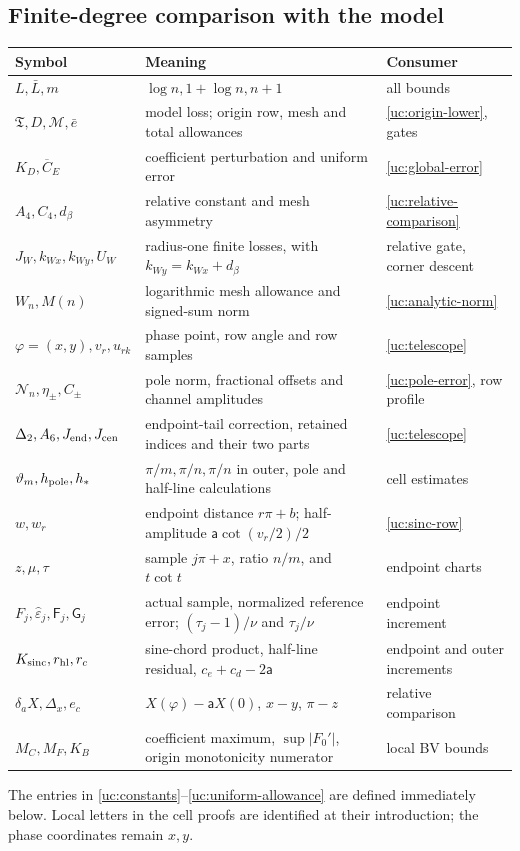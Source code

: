 \subsection{Finite-degree comparison with the model}
\label{uc:finite-comparison}

\begin{center}\small
\begin{tabular}{@{}p{.22\linewidth}p{.47\linewidth}p{.23\linewidth}@{}}
\toprule
Symbol & Meaning & Consumer\\\midrule
$L,\bar L,m$ & $\log n,1+\log n,n+1$ & all bounds\\
$\mathfrak T,D,\mathcal M,\bar e$ & model loss; origin row, mesh and total allowances & \eqref{uc:origin-lower}, gates\\
$K_D,\overline C_E$ & coefficient perturbation and uniform error & \eqref{uc:global-error}\\
$A_4,C_4,d_\beta$ & relative constant and mesh asymmetry & \eqref{uc:relative-comparison}\\
$J_W,k_{Wx},k_{Wy},U_W$ & radius-one finite losses, with $k_{Wy}=k_{Wx}+d_\beta$ & relative gate, corner descent\\
$W_n,M(n)$ & logarithmic mesh allowance and signed-sum norm & \eqref{uc:analytic-norm}\\
$\varphi=(x,y),v_r,u_{rk}$ & phase point, row angle and row samples & \eqref{uc:telescope}\\
$\mathcal N_n,\eta_\pm,C_\pm$ & pole norm, fractional offsets and channel amplitudes & \eqref{uc:pole-error}, row profile\\
$\Delta_2,A_6,J_{\rm end},J_{\rm cen}$ & endpoint-tail correction, retained indices and their two parts & \eqref{uc:telescope}\\
$\vartheta_m,h_{\rm pole},h_*$ & $\pi/m,\pi/n,\pi/n$ in outer, pole and half-line calculations & cell estimates\\
$w,w_r$ & endpoint distance $r\pi+b$; half-amplitude $\mathsf a\cot(v_r/2)/2$ & \eqref{uc:sinc-row}\\
$z,\mu,\tau$ & sample $j\pi+x$, ratio $n/m$, and $t\cot t$ & endpoint charts\\
$F_j,\widehat\varepsilon_j,\mathsf F_j,\mathsf G_j$ & actual sample, normalized reference error; $(\tau_j-1)/\nu$ and $\tau_j/\nu$ & endpoint increment\\
$K_{\rm sinc},r_{\rm hl},r_c$ & sine-chord product, half-line residual, $c_e+c_d-2\mathsf a$ & endpoint and outer increments\\
$\delta_aX,\Delta_x,e_c$ & $X(\varphi)-\mathsf aX(0)$, $x-y$, $\pi-z$ & relative comparison\\
$M_C,M_F,K_B$ & coefficient maximum, $\sup|F_0'|$, origin monotonicity numerator & local BV bounds\\
\bottomrule
\end{tabular}
\end{center}
The entries in \eqref{uc:constants}--\eqref{uc:uniform-allowance}
are defined immediately below. Local letters in the cell proofs are
identified at their introduction; the phase coordinates remain $x,y$.

